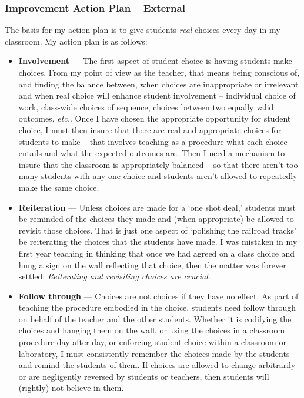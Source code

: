 \documentclass[11pt,twocolumn]{article}%
\def\foreign{\em}
\def\etc{{\foreign etc.}}
\begin{document}
\subsubsection{Improvement Action Plan -- External}
\label{Improvement Action Plan -- External}

The basis for my action plan is to give students {\em real} choices
every day in my classroom. My action plan is as follows:

\begin{itemize}

\item {\bf Involvement} --- The first aspect of student choice is
having students make choices. From my point of view as the teacher,
that means being conscious of, and finding the balance between, when
choices are inappropriate or irrelevant and when real choice will
enhance student involvement -- individual choice of work, class-wide
choices of sequence, choices between two equally valid outcomes,
\etc. Once I have chosen the appropriate opportunity for student
choice, I must then insure that there are real and appropriate
choices for students to make -- that involves teaching as a
procedure what each choice entails and what the expected outcomes
are. Then I need a mechanism to insure that the classroom is
appropriately balanced -- so that there aren't too many students
with any one choice and students aren't allowed to repeatedly make
the same choice.

\item {\bf Reiteration} --- Unless choices are made for a `one shot
deal,' students must be reminded of the choices they made and (when
appropriate) be allowed to revisit those choices. That is just one
aspect of `polishing the railroad tracks' \cite[p. 80]{book:ccm} be
reiterating the choices that the students have made. I was mistaken
in my first year teaching in thinking that once we had agreed on a
class choice and hung a sign on the wall reflecting that choice,
then the matter was forever settled. {\em Reiterating and revisiting
choices are crucial}.

\item {\bf Follow through} --- Choices are not choices if they have
no effect. As part of teaching the procedure embodied in the choice,
students need follow through on behalf of the teacher and the other
students. Whether it is codifying the choices and hanging them on
the wall, or using the choices in a classroom procedure day after
day, or enforcing student choice within a classroom or laboratory, I
must consistently remember the choices made by the students and
remind the students of them. If choices are allowed to change
arbitrarily or are negligently reversed by students or teachers,
then students will (rightly) not believe in them.

\end{itemize}
\end{document}
